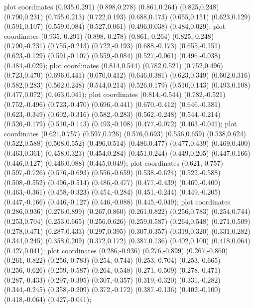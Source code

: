  plot coordinates {(0.935,0.291) (0.898,0.278) (0.861,0.264) (0.825,0.248) (0.790,0.231) (0.755,0.213) (0.722,0.193) (0.688,0.173) (0.655,0.151) (0.623,0.129) (0.591,0.107) (0.559,0.084) (0.527,0.061) (0.496,0.038) (0.484,0.029)};
 plot coordinates {(0.935,-0.291) (0.898,-0.278) (0.861,-0.264) (0.825,-0.248) (0.790,-0.231) (0.755,-0.213) (0.722,-0.193) (0.688,-0.173) (0.655,-0.151) (0.623,-0.129) (0.591,-0.107) (0.559,-0.084) (0.527,-0.061) (0.496,-0.038) (0.484,-0.029)};
 plot coordinates {(0.814,0.544) (0.782,0.521) (0.752,0.496) (0.723,0.470) (0.696,0.441) (0.670,0.412) (0.646,0.381) (0.623,0.349) (0.602,0.316) (0.582,0.283) (0.562,0.248) (0.544,0.214) (0.526,0.179) (0.510,0.143) (0.493,0.108) (0.477,0.072) (0.463,0.041)};
 plot coordinates {(0.814,-0.544) (0.782,-0.521) (0.752,-0.496) (0.723,-0.470) (0.696,-0.441) (0.670,-0.412) (0.646,-0.381) (0.623,-0.349) (0.602,-0.316) (0.582,-0.283) (0.562,-0.248) (0.544,-0.214) (0.526,-0.179) (0.510,-0.143) (0.493,-0.108) (0.477,-0.072) (0.463,-0.041)};
 plot coordinates {(0.621,0.757) (0.597,0.726) (0.576,0.693) (0.556,0.659) (0.538,0.624) (0.522,0.588) (0.508,0.552) (0.496,0.514) (0.486,0.477) (0.477,0.439) (0.469,0.400) (0.463,0.361) (0.458,0.323) (0.454,0.284) (0.451,0.244) (0.449,0.205) (0.447,0.166) (0.446,0.127) (0.446,0.088) (0.445,0.049)};
 plot coordinates {(0.621,-0.757) (0.597,-0.726) (0.576,-0.693) (0.556,-0.659) (0.538,-0.624) (0.522,-0.588) (0.508,-0.552) (0.496,-0.514) (0.486,-0.477) (0.477,-0.439) (0.469,-0.400) (0.463,-0.361) (0.458,-0.323) (0.454,-0.284) (0.451,-0.244) (0.449,-0.205) (0.447,-0.166) (0.446,-0.127) (0.446,-0.088) (0.445,-0.049)};
 plot coordinates {(0.286,0.936) (0.276,0.899) (0.267,0.860) (0.261,0.822) (0.256,0.783) (0.254,0.744) (0.253,0.704) (0.253,0.665) (0.256,0.626) (0.259,0.587) (0.264,0.548) (0.271,0.509) (0.278,0.471) (0.287,0.433) (0.297,0.395) (0.307,0.357) (0.319,0.320) (0.331,0.282) (0.344,0.245) (0.358,0.209) (0.372,0.172) (0.387,0.136) (0.402,0.100) (0.418,0.064) (0.427,0.041)};
 plot coordinates {(0.286,-0.936) (0.276,-0.899) (0.267,-0.860) (0.261,-0.822) (0.256,-0.783) (0.254,-0.744) (0.253,-0.704) (0.253,-0.665) (0.256,-0.626) (0.259,-0.587) (0.264,-0.548) (0.271,-0.509) (0.278,-0.471) (0.287,-0.433) (0.297,-0.395) (0.307,-0.357) (0.319,-0.320) (0.331,-0.282) (0.344,-0.245) (0.358,-0.209) (0.372,-0.172) (0.387,-0.136) (0.402,-0.100) (0.418,-0.064) (0.427,-0.041)};
